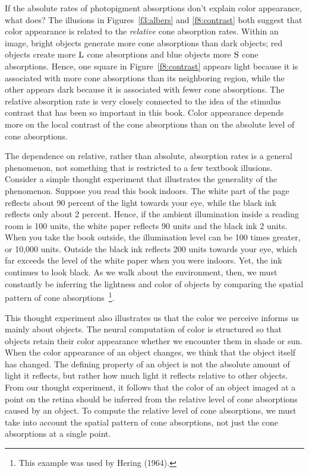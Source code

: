 If the absolute rates of photopigment absorptions don't explain color
appearance, what does? The illusions in Figures~\ref{f3:albers} and
\ref{f8:contrast} both suggest that color appearance is related to the
{\em relative} cone absorption rates.  Within an image, bright objects
generate more cone absorptions than dark objects; red objects create
more $\mbox{L}$ cone absorptions and blue objects more $\mbox{S}$ cone
absorptions.  Hence, one square in Figure~\ref{f8:contrast} appears
light because it is associated with more cone absorptions than its
neighboring region, while the other appears dark because it is
associated with fewer cone absorptions.  The relative absorption rate
is very closely connected to the idea of the stimulus contrast that
has been so important in this book.  Color appearance depends more on
the local contrast of the cone absorptions than on the absolute level
of cone absorptions.

The dependence on relative, rather than absolute, absorption rates is
a general phenomenon, not something that is restricted to a few
textbook illusions.  Consider a simple thought experiment that
illustrates the generality of the phenomenon.  Suppose you read this
book indoors.  The white part of the page reflects about 90 percent of
the light towards your eye, while the black ink reflects only about 2
percent.  Hence, if the ambient illumination inside a reading room is
100 units, the white paper reflects 90 units and the black ink 2
units.  When you take the book outside, the illumination level can be
100 times greater, or 10,000 units.  Outside the black ink reflects
200 units towards your eye, which far exceeds the level of the white
paper when you were indoors.  Yet, the ink continues to look black.
As we walk about the environment, then, we must constantly be
inferring the lightness and color of objects by comparing the spatial
pattern of cone absorptions~\footnote{This example was used by Hering
(1964).}.

This thought experiment also illustrates us that the color we perceive
informs us mainly about objects.  The neural computation of color is
structured so that objects retain their color appearance whether we
encounter them in shade or sun.  When the color appearance of an
object changes, we think that the object itself has changed.  The
defining property of an object is not the absolute amount of light it
reflects, but rather how much light it reflects relative to other
objects.  From our thought experiment, it follows that the color of an
object imaged at a point on the retina should be inferred from the
relative level of cone absorptions caused by an object.  To compute
the relative level of cone absorptions, we must take into account the
spatial pattern of cone absorptions, not just the cone absorptions at
a single point.


